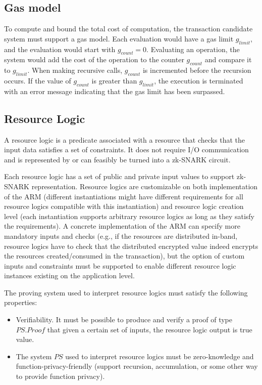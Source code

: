 \documentclass[
    11pt,            %
    techreport,        %
    affiltop,       %
]{art}
\begin{document}
\subsection{Gas model}
To compute and bound the total cost of computation, the transaction candidate system must support a gas model. Each evaluation would have a gas limit $g_{limit}$, and the evaluation would start with $g_{count} = 0$. Evaluating an operation, the system would add the cost of the operation to the counter $g_{count}$ and compare it to $g_{limit}$. When making recursive calls, $g_{count}$ is incremented before the recursion occurs. If the value of $g_{count}$ is greater than $g_{limit}$, the execution is terminated with an error message indicating that the gas limit has been surpassed.

\subsection{Resource Logic} %
A resource logic is a predicate associated with a resource that checks that the input data satisfies a set of constraints. It does not require I/O communication and is represented by or can feasibly be turned into a zk-SNARK circuit. 

Each resource logic has a set of public and private input values to support zk-SNARK representation. Resource logics are customizable on both implementation of the ARM (different instantiations might have different requirements for all resource logics compatible with this instantiation) and resource logic creation level (each instantiation supports arbitrary resource logics as long as they satisfy the requirements). A concrete implementation of the ARM can specify more mandatory inputs and checks (e.g., if the resources are distributed in-band, resource logics have to check that the distributed encrypted value indeed encrypts the resources created/consumed in the transaction), but the option of custom inputs and constraints must be supported to enable different resource logic instances existing on the application level.


The proving system used to interpret resource logics must satisfy the following properties:
\begin{itemize}
    \item Verifiability. It must be possible to produce and verify a proof of type $PS.Proof$ that given a certain set of inputs, the resource logic output is true value.
    \item The system $PS$ used to interpret resource logics must be zero-knowledge and function-privacy-friendly (support recursion, accumulation, or some other way to provide function privacy).
\end{itemize}
\end{document}
